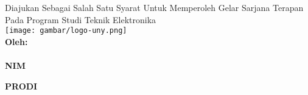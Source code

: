 

\begin{titlepage}
    \begin{center}

        \begin{doublespace}
            \textbf{\Large{\MakeUppercase{\judulid}}}\\[2cm]
        \end{doublespace}
        \textbf{\MakeUppercase{\large{\tipe}}}\\[0.5cm]

        Diajukan Sebagai Salah Satu Syarat Untuk Memperoleh Gelar Sarjana Terapan Pada Program Studi Teknik Elektronika {\fakultas} {\universitas}\\[1.5cm]

        \texttt{[image: gambar/logo-uny.png]}\\[1.5cm]

        \textbf{Oleh:} \\
        \textbf{\MakeUppercase{{\penulis}}} \\
        \textbf{NIM} \textbf{{\nim}}\\[2cm]

        \vfill

        \textbf{\large \MakeUppercase{Prodi \prodi}}\\
        \textbf{\large \MakeUppercase{\fakultas}}\\
        \textbf{\large \MakeUppercase{\universitas}}\\
        \textbf{\large \the\year{}}\\
    \end{center}
\end{titlepage}

